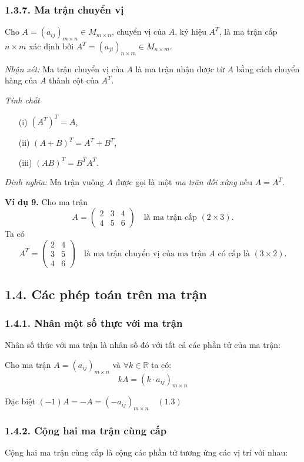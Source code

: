 \subsubsection*{1.3.7. Ma trận chuyển vị}
Cho \( A = (a_{ij})_{m \times n} \in M_{m \times n} \), chuyển vị của \( A \), ký hiệu \( A^T \), là ma trận cấp \( n \times m \) xác định bởi \( A^T = (a_{ji})_{n \times m} \in M_{n \times m} \).

\textit{Nhận xét:} Ma trận chuyển vị của \( A \) là ma trận nhận được từ \( A \) bằng cách chuyển hàng của \( A \) thành cột của \( A^T \).

\textit{Tính chất}
\begin{itemize}
    \item[(i)] \( (A^T)^T = A \),
    \item[(ii)] \( (A + B)^T = A^T + B^T \),
    \item[(iii)] \( (AB)^T = B^T A^T \).
\end{itemize}

\textit{Định nghĩa:} Ma trận vuông \( A \) được gọi là một \textit{ma trận đối xứng} nếu \( A = A^T \).

\textbf{Ví dụ 9.} Cho ma trận
\[
A = \begin{pmatrix}
2 & 3 & 4 \\
4 & 5 & 6
\end{pmatrix}
\quad \text{là ma trận cấp } (2 \times 3).
\]
Ta có
\[
A^T = \begin{pmatrix}
2 & 4 \\
3 & 5 \\
4 & 6
\end{pmatrix}
\quad \text{là ma trận chuyển vị của ma trận } A \text{ có cấp là } (3 \times 2).
\]

\subsection*{1.4. Các phép toán trên ma trận}
\subsubsection*{1.4.1. Nhân một số thực với ma trận}
Nhân số thức với ma trận là nhân số đó với tất cả các phần tử của ma trận:

Cho ma trận \( A = (a_{ij})_{m \times n} \) và \( \forall k \in \mathbb{R} \) ta có:
\[
kA = (k \cdot a_{ij})_{m \times n}
\]

Đặc biệt \( (-1)A = -A = (-a_{ij})_{m \times n} \quad (1.3) \)


\subsubsection*{1.4.2. Cộng hai ma trận cùng cấp}
Cộng hai ma trận cùng cấp là cộng các phần tử tương ứng các vị trí với nhau:

